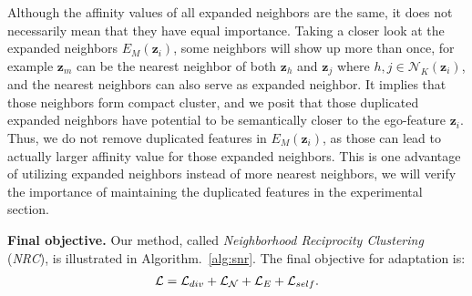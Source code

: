 \documentclass{article}
\begin{document}
Although the affinity values of all expanded neighbors are the same, it does not necessarily mean that they have equal importance. Taking a closer look at the expanded neighbors $E_M(\bm{z}_i)$, some neighbors will show up more than once, for example $\bm{z}_m$ can be the nearest neighbor of both $\bm{z}_h$ and $\bm{z}_j$ where $h,j \in \mathcal{N}_K(\bm{z}_i)$, and the nearest neighbors can also serve as expanded neighbor. It implies that those neighbors form compact cluster, and we posit that those duplicated expanded neighbors have potential to be semantically closer to the ego-feature $\bm{z}_i$. Thus, we do not remove duplicated features in $E_M(\bm{z}_i)$, as those can lead to actually larger affinity value for those expanded neighbors. This is one advantage of utilizing expanded neighbors instead of more nearest neighbors, we will verify the importance of maintaining  the duplicated features in the experimental section.







\noindent \textbf{Final objective.}
Our method, called \emph{Neighborhood Reciprocity Clustering} (\emph{NRC}),  is illustrated in Algorithm.~\ref{alg:snr}. The final objective for adaptation is:
\begin{eqnarray}\label{eq:final}
\small
    \mathcal{L}=\mathcal{L}_{div}+\mathcal{L}_{\mathcal{N}}+\mathcal{L}_E+\mathcal{L}_{self}.
\end{eqnarray}
\end{document}
